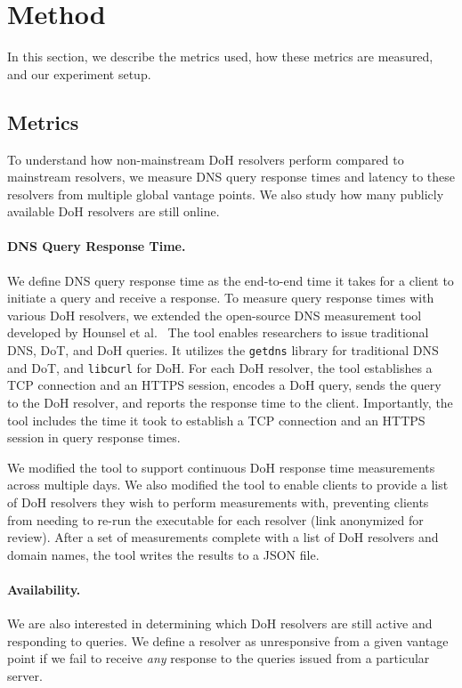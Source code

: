 \section{Method}\label{sec:method}
In this section, we describe the metrics used, how these metrics are measured, and our experiment setup.

\subsection{Metrics}
To understand how non-mainstream DoH resolvers perform compared to mainstream resolvers, we measure DNS query response times and latency to these resolvers from multiple global vantage points.
We also study how many publicly available DoH resolvers are still online.

\paragraph{DNS Query Response Time.}
We define DNS query response time as the end-to-end time it takes for a client to initiate a query and receive a response.
To measure query response times with various DoH resolvers, we extended the
open-source DNS measurement tool developed by Hounsel et al.~\cite{hounsel2020comparing}
The tool enables researchers to issue traditional DNS, DoT, and DoH queries.
It utilizes the \texttt{getdns} library for traditional DNS and DoT, and \texttt{libcurl} for DoH.
For each DoH resolver, the tool establishes a TCP connection and an HTTPS session, encodes a DoH query, sends the query to the DoH resolver, and reports the response time to the client.
Importantly, the tool includes the time it took to establish a TCP connection and an HTTPS session in query response times.

We modified the tool to support continuous DoH response time measurements across multiple days.
We also modified the tool to enable clients to provide a list of DoH resolvers
they wish to perform measurements with, preventing clients from needing to
re-run the executable for each resolver (link anonymized for review).
After a set of measurements complete with a list of DoH resolvers and domain names, the tool writes the results to a JSON file.

\paragraph{Availability.}
We are also interested in determining which DoH resolvers are still active and responding to queries.
We define a resolver as unresponsive from a given vantage point if we fail to receive \emph{any} response to the queries issued from a particular server.


